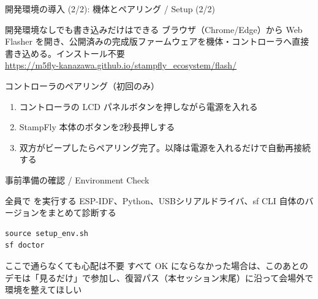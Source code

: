 \begin{frame}{開発環境の導入 (2/2): 機体とペアリング / Setup (2/2)}
  \begin{block}{開発環境なしでも書き込みだけはできる}
    \small ブラウザ（Chrome/Edge）から Web Flasher を開き、公開済みの完成版ファームウェアを機体・コントローラへ直接書き込める。インストール不要\\
    \url{https://m5fly-kanazawa.github.io/stampfly_ecosystem/flash/}
  \end{block}

  \vspace{0.5em}

  \begin{exampleblock}{コントローラのペアリング（初回のみ）}
    \footnotesize
    \begin{enumerate}\setlength{\itemsep}{2pt}
      \item コントローラの LCD パネルボタンを押しながら電源を入れる
      \item StampFly 本体のボタンを2秒長押しする
      \item 双方がビープしたらペアリング完了。以降は電源を入れるだけで自動再接続する
    \end{enumerate}
  \end{exampleblock}
\end{frame}

\begin{frame}[fragile]{事前準備の確認 / Environment Check}
  \begin{block}{全員で  を実行する}
    \small ESP-IDF、Python、USBシリアルドライバ、sf CLI 自体のバージョンをまとめて診断する
  \end{block}

  \begin{lstlisting}[style=sfbash, numbers=none]
source setup_env.sh
sf doctor
  \end{lstlisting}

  \vspace{0.3em}

  \begin{alertblock}{ここで通らなくても心配は不要}
    \footnotesize すべて OK にならなかった場合は、このあとのデモは「見るだけ」で参加し、復習パス（本セッション末尾）に沿って会場外で環境を整えてほしい
  \end{alertblock}
\end{frame}

